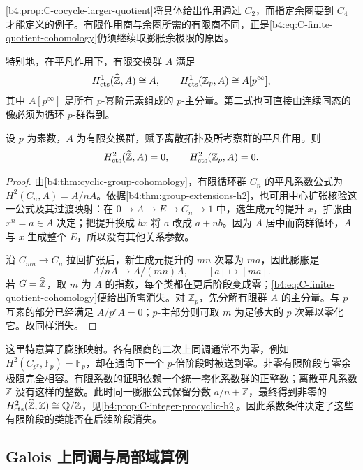 \cref{b4:prop:C-cocycle-larger-quotient}将具体给出作用通过 \(C_2\)，而指定余圈要到 \(C_4\) 才能定义的例子。有限作用商与余圈所需的有限商不同，正是\eqref{b4:eq:C-finite-quotient-cohomology}仍须继续取膨胀余极限的原因。

\ProseParagraphBreak
特别地，在平凡作用下，有限交换群 \(A\) 满足
\[
	H^1_{\mathrm{cts}}(\widehat{\vphantom{Z}\mathbb Z},A)\cong A, \qquad H^1_{\mathrm{cts}}(\mathbb Z_p,A)\cong A[p^\infty],
\]
其中 \(A[p^\infty]\) 是所有 \(p\)-幂阶元素组成的 \(p\)-主分量。第二式也可直接由连续同态的像必须为循环 \(p\)-群得到。

\begin{proposition}\label{b4:prop:C-procyclic-h2}
	设 \(p\) 为素数，\(A\) 为有限交换群，赋予离散拓扑及所考察群的平凡作用。则
	\[
		H^2_{\mathrm{cts}}(\widehat{\vphantom{Z}\mathbb Z},A)=0, \qquad H^2_{\mathrm{cts}}(\mathbb Z_p,A)=0.
	\]
\end{proposition}
\begin{proof}
	由\cref{b4:thm:cyclic-group-cohomology}，有限循环群 \(C_n\) 的平凡系数公式为 \(H^2(C_n,A)=A/nA\)。依据\cref{b4:thm:group-extensions-h2}，也可用中心扩张核验这一公式及其过渡映射：在 \(0\rightarrow A\rightarrow E\rightarrow C_n\rightarrow1\) 中，选生成元的提升 \(x\)，扩张由 \(x^n=a\in A\) 决定；把提升换成 \(bx\) 将 \(a\) 改成 \(a+nb\)。因为 \(A\) 居中而商群循环，\(A\) 与 \(x\) 生成整个 \(E\)，所以没有其他关系参数。

	沿 \(C_{mn}\rightarrow C_n\) 拉回扩张后，新生成元提升的 \(mn\) 次幂为 \(ma\)，因此膨胀是
	\[
		A/nA\longrightarrow A/(mn)A,\qquad [a]\longmapsto[ma].
	\]
	若 \(G=\widehat{\vphantom{Z}\mathbb Z}\)，取 \(m\) 为 \(A\) 的指数，每个类都在更后阶段变成零；\eqref{b4:eq:C-finite-quotient-cohomology}便给出所需消失。对 \(\mathbb Z_p\)，先分解有限群 \(A\) 的主分量。与 \(p\) 互素的部分已经满足 \(A/p^rA=0\)；\(p\)-主部分则可取 \(m\) 为足够大的 \(p\) 次幂以零化它。故同样消失。
\end{proof}

这里特意算了膨胀映射。各有限商的二次上同调通常不为零，例如 \(H^2(C_{p^r},\mathbb F_p)=\mathbb F_p\)，却在通向下一个 \(p\)-倍阶段时被送到零。非零有限阶段与零余极限完全相容。有限系数的证明依赖一个统一零化系数群的正整数；离散平凡系数 \(\mathbb Z\) 没有这样的整数。此时同一膨胀公式保留分数 \(a/n+\mathbb Z\)，最终得到非零的 \(H^2_{\mathrm{cts}}(\widehat{\vphantom{Z}\mathbb Z},\mathbb Z)\cong\mathbb Q/\mathbb Z\)，见\cref{b4:prop:C-integer-procyclic-h2}。因此系数条件决定了这些有限阶段的类能否在后续阶段消失。

\subsection{Galois 上同调与局部域算例}
\label{b4:subsec:C02:03}

